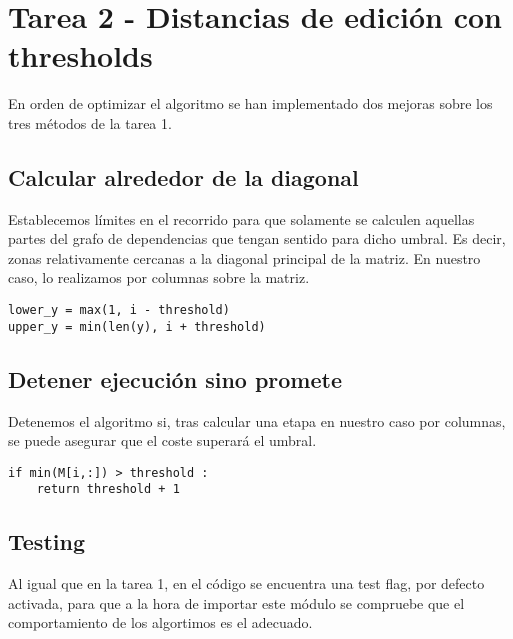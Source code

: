 \section{Tarea 2 - Distancias de edición con thresholds}
En orden de optimizar el algoritmo se han implementado dos mejoras sobre los tres métodos de la tarea 1.
\subsection{Calcular alrededor de la diagonal}
Establecemos límites en el recorrido para que solamente se calculen aquellas partes del grafo de dependencias que tengan sentido para dicho umbral.
Es decir, zonas relativamente cercanas a la diagonal principal de la matriz. En nuestro caso, lo realizamos por columnas sobre la matriz.
        

\begin{lstlisting}[caption=Calculo de los umbrales]
lower_y = max(1, i - threshold)
upper_y = min(len(y), i + threshold)
\end{lstlisting}

\subsection{Detener ejecución sino promete}
Detenemos el algoritmo si, tras calcular una etapa en nuestro caso por columnas, se puede asegurar que el coste superará el umbral.

\begin{lstlisting}[caption=Parar ejecución sino promete]
if min(M[i,:]) > threshold :
    return threshold + 1
\end{lstlisting}


\subsection{Testing}
Al igual que en la tarea 1, en el código se encuentra una test flag, por defecto activada, para que a la hora de importar este módulo se compruebe que el comportamiento de los algortimos es el adecuado.

\newpage